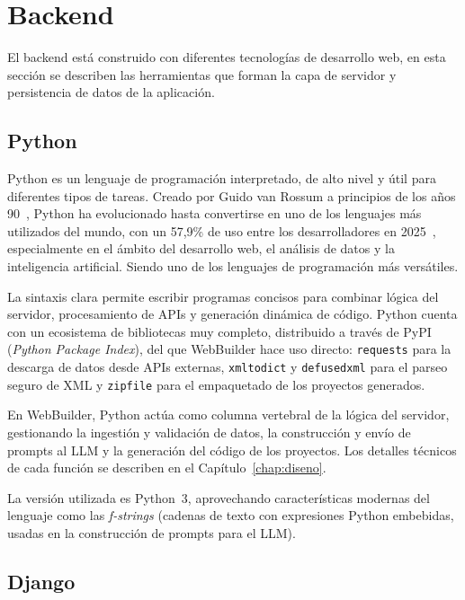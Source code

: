 \section{Backend} 
\label{sec:backend}

El backend está construido con diferentes tecnologías de desarrollo web, en esta sección se describen las herramientas que forman la capa de servidor y persistencia de datos de la aplicación.


\subsection{Python}
\label{subsec:python}

Python es un lenguaje de programación interpretado, de alto nivel y útil para diferentes tipos de tareas. Creado por Guido van Rossum a principios de los años 90~\cite{python_history}, Python ha evolucionado hasta convertirse en uno de los lenguajes más utilizados del mundo, con un 57,9\% de uso entre los desarrolladores en 2025~\cite{stackoverflow_survey_2025}, especialmente en el ámbito
del desarrollo web, el análisis de datos y la inteligencia artificial. Siendo uno de los lenguajes de programación más versátiles.

La sintaxis clara permite escribir programas concisos para combinar lógica del servidor, procesamiento de APIs y generación dinámica de código. Python cuenta con un ecosistema de bibliotecas muy completo, distribuido a través de PyPI (\emph{Python Package Index}), del que WebBuilder hace uso directo: \texttt{requests} para la descarga de datos desde APIs externas, \texttt{xmltodict} y \texttt{defusedxml} para el parseo seguro de XML y \texttt{zipfile} para el empaquetado de los proyectos generados.


En WebBuilder, Python actúa como columna vertebral de la lógica del servidor, gestionando la ingestión y validación de datos, la construcción y envío de prompts al LLM y la generación del código de los proyectos. Los detalles técnicos de cada función se describen en el Capítulo~\ref{chap:diseno}.

La versión utilizada es Python~3, aprovechando características modernas del lenguaje
como las \emph{f-strings} (cadenas de texto con expresiones Python embebidas, usadas en la construcción de prompts para el LLM).

\subsection{Django}
\label{subsec:django}

